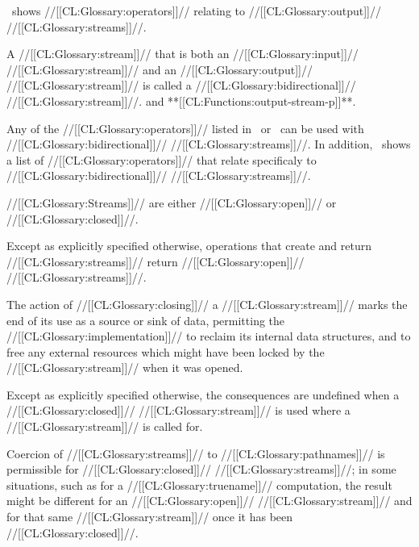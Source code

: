 \Thenextfigure\ shows //[[CL:Glossary:operators]]// relating to //[[CL:Glossary:output]]// //[[CL:Glossary:streams]]//.

 

A //[[CL:Glossary:stream]]// that is both an //[[CL:Glossary:input]]// //[[CL:Glossary:stream]]// and an //[[CL:Glossary:output]]// //[[CL:Glossary:stream]]// is called a //[[CL:Glossary:bidirectional]]// //[[CL:Glossary:stream]]//.  and **[[CL:Functions:output-stream-p]]**.

Any of the //[[CL:Glossary:operators]]// listed in \figref\InputStreamOps\ or \figref\OutputStreamOps\ can be used with //[[CL:Glossary:bidirectional]]// //[[CL:Glossary:streams]]//.  In addition, \thenextfigure\ shows a list of //[[CL:Glossary:operators]]// that relate specificaly to  //[[CL:Glossary:bidirectional]]// //[[CL:Glossary:streams]]//.


\endsubsubsubsection%

 

//[[CL:Glossary:Streams]]// are either //[[CL:Glossary:open]]// or //[[CL:Glossary:closed]]//.  

Except as explicitly specified otherwise, operations that create and return //[[CL:Glossary:streams]]// return //[[CL:Glossary:open]]// //[[CL:Glossary:streams]]//.

The action of //[[CL:Glossary:closing]]// a //[[CL:Glossary:stream]]// marks the end of its use as a source or sink of data, permitting the //[[CL:Glossary:implementation]]// to reclaim its internal data structures, and to free any external resources which might have been locked by the //[[CL:Glossary:stream]]// when it was opened.

Except as explicitly specified otherwise, the consequences are undefined when a //[[CL:Glossary:closed]]// //[[CL:Glossary:stream]]//  is used where a //[[CL:Glossary:stream]]// is called for.

Coercion of //[[CL:Glossary:streams]]// to //[[CL:Glossary:pathnames]]//  is permissible for //[[CL:Glossary:closed]]// //[[CL:Glossary:streams]]//; in some situations, such as for a //[[CL:Glossary:truename]]// computation,  the result might be different for an //[[CL:Glossary:open]]// //[[CL:Glossary:stream]]// and for that same //[[CL:Glossary:stream]]// once it has been //[[CL:Glossary:closed]]//.

